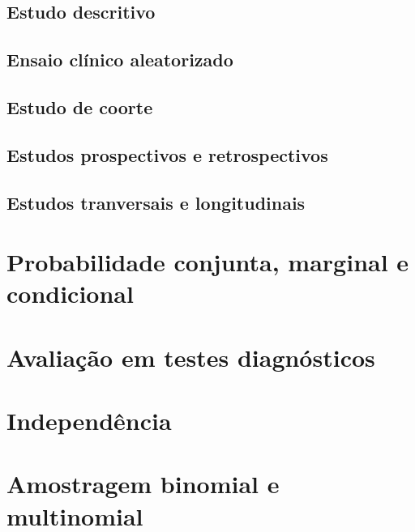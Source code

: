 \documentclass[]{book}
\begin{document}
\hypertarget{estudo-descritivo}{%
\subsection{Estudo descritivo}\label{estudo-descritivo}}

\hypertarget{ensaio-clinico-aleatorizado}{%
\subsection{Ensaio clínico aleatorizado}\label{ensaio-clinico-aleatorizado}}

\hypertarget{estudo-de-coorte}{%
\subsection{Estudo de coorte}\label{estudo-de-coorte}}

\hypertarget{estudos-prospectivos-e-retrospectivos}{%
\subsection{Estudos prospectivos e retrospectivos}\label{estudos-prospectivos-e-retrospectivos}}

\hypertarget{estudos-tranversais-e-longitudinais}{%
\subsection{Estudos tranversais e longitudinais}\label{estudos-tranversais-e-longitudinais}}

\hypertarget{probabilidade-conjunta-marginal-e-condicional}{%
\section{Probabilidade conjunta, marginal e condicional}\label{probabilidade-conjunta-marginal-e-condicional}}

\hypertarget{avaliacao-em-testes-diagnosticos}{%
\section{Avaliação em testes diagnósticos}\label{avaliacao-em-testes-diagnosticos}}

\hypertarget{independencia}{%
\section{Independência}\label{independencia}}

\hypertarget{amostragem-binomial-e-multinomial}{%
\section{Amostragem binomial e multinomial}\label{amostragem-binomial-e-multinomial}}
\end{document}
